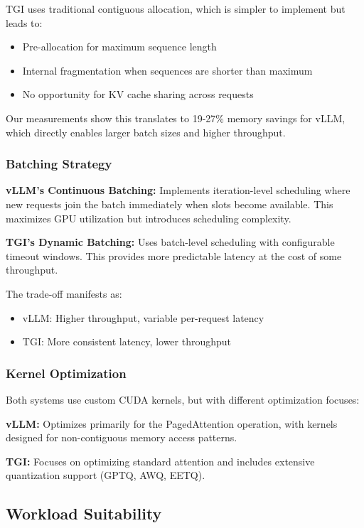 \documentclass{article}
\begin{document}
TGI uses traditional contiguous allocation, which is simpler to implement but leads to:
\begin{itemize}
    \item Pre-allocation for maximum sequence length
    \item Internal fragmentation when sequences are shorter than maximum
    \item No opportunity for KV cache sharing across requests
\end{itemize}

Our measurements show this translates to 19-27\% memory savings for vLLM, which directly enables larger batch sizes and higher throughput.

\subsubsection{Batching Strategy}

\textbf{vLLM's Continuous Batching:} Implements iteration-level scheduling where new requests join the batch immediately when slots become available. This maximizes GPU utilization but introduces scheduling complexity.

\textbf{TGI's Dynamic Batching:} Uses batch-level scheduling with configurable timeout windows. This provides more predictable latency at the cost of some throughput.

The trade-off manifests as:
\begin{itemize}
    \item vLLM: Higher throughput, variable per-request latency
    \item TGI: More consistent latency, lower throughput
\end{itemize}

\subsubsection{Kernel Optimization}

Both systems use custom CUDA kernels, but with different optimization focuses:

\textbf{vLLM:} Optimizes primarily for the PagedAttention operation, with kernels designed for non-contiguous memory access patterns.

\textbf{TGI:} Focuses on optimizing standard attention and includes extensive quantization support (GPTQ, AWQ, EETQ).

\subsection{Workload Suitability}
\end{document}
